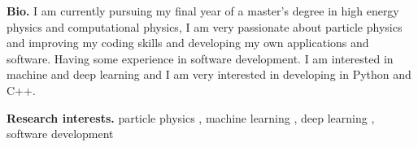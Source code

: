 \par{
{\textbf{Bio.}} 
I am currently pursuing my final year of a master's degree in  high energy physics and computational physics, I am very passionate about particle physics and improving my coding skills and developing my own applications and software. Having some experience in software development. I am interested in machine and deep learning and I am very interested in developing in Python and C++.

{\textbf{Research interests.}} 
particle physics , machine learning , deep learning , software development  
}